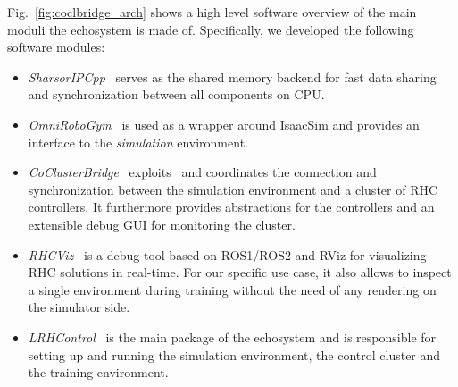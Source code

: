 Fig.~\ref{fig:coclbridge_arch} shows a high level software overview of the main moduli the echosystem is made of. Specifically, we developed the following software modules:
\begin{itemize}
	\item \textit{SharsorIPCpp}~\cite{mystuff::sharsoripcpp} serves as the shared memory backend for fast data sharing and synchronization between all components on CPU.
	\item \textit{OmniRoboGym}~\cite{mystuff::omnirobogym} is used as a wrapper around IsaacSim and provides an interface to the \textit{simulation} environment.
	\item \textit{CoClusterBridge}~\cite{mystuff::coclusterbridge} exploits~\cite{mystuff::sharsoripcpp} and coordinates the connection and synchronization between the simulation environment and a cluster of RHC controllers. It furthermore provides abstractions for the controllers and an extensible debug GUI for monitoring the cluster.
	\item \textit{RHCViz}~\cite{mystuff::rhcviz} is a debug tool based on ROS1/ROS2 and RViz for visualizing RHC solutions in real-time. For our specific use case, it also allows to inspect a single environment during training without the need of any rendering on the simulator side.
	\item \textit{LRHControl}~\cite{mystuff::lrhccontrol} is the main package of the echosystem and is responsible for setting up and running the simulation environment, the control cluster and the training environment.
\end{itemize}




